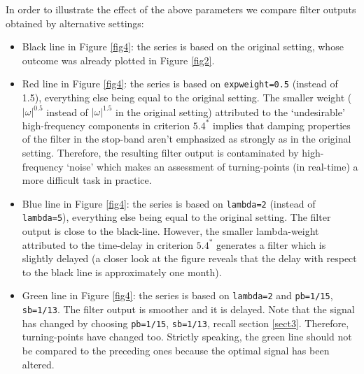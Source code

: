 \documentclass[a4paper]{article}
\begin{document}
\noindent In order to illustrate the effect of the above parameters we
compare filter outputs obtained by alternative settings:
\begin{itemize}
\item Black line in Figure \ref{fig4}: the series is based on the
  original setting, whose outcome was already plotted in Figure
  \ref{fig2}. 
\item Red line in Figure \ref{fig4}: the series is based on
  \texttt{expweight=0.5} (instead of 1.5), everything else being equal
  to the original setting. The smaller weight ($|\omega|^{0.5}$
  instead of $|\omega|^{1.5}$ in the original setting) attributed to
  the `undesirable' high-frequency components in criterion $5.4^*$
  implies that damping properties of the filter in the stop-band
  aren't emphasized as strongly as in the original setting. Therefore,
  the resulting filter output is contaminated by high-frequency
  `noise' which makes an assessment of turning-points (in real-time) a
  more difficult task in practice. 
\item Blue line in Figure \ref{fig4}: the series is based on
  \texttt{lambda=2} (instead of \texttt{lambda=5}), everything else
  being equal to the original setting. The filter output is close to
  the black-line. However, the smaller lambda-weight attributed to the
  time-delay in criterion $5.4^*$ generates a filter which is slightly
  delayed (a closer look at the figure reveals that the delay with
  respect to the black line is approximately one month). 
\item Green line in Figure \ref{fig4}: the series is based on
  \texttt{lambda=2} and \texttt{pb=1/15}, \texttt{sb=1/13}. The filter
  output is smoother and it is delayed. Note that the signal has
  changed by choosing \texttt{pb=1/15}, \texttt{sb=1/13}, recall
  section \ref{sect3}. Therefore, turning-points have changed too. 
  Strictly speaking, the green line should not be compared to the
  preceding ones because the optimal signal has been altered. 
\end{itemize}
\end{document}
